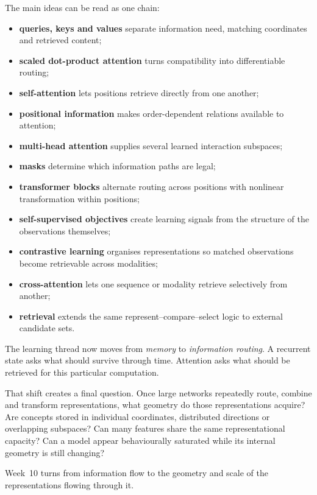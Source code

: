The main ideas can be read as one chain:
\begin{itemize}[leftmargin=*]
  \item \textbf{queries, keys and values} separate information need, matching coordinates and retrieved content;
  \item \textbf{scaled dot-product attention} turns compatibility into differentiable routing;
  \item \textbf{self-attention} lets positions retrieve directly from one another;
  \item \textbf{positional information} makes order-dependent relations available to attention;
  \item \textbf{multi-head attention} supplies several learned interaction subspaces;
  \item \textbf{masks} determine which information paths are legal;
  \item \textbf{transformer blocks} alternate routing across positions with nonlinear transformation within positions;
  \item \textbf{self-supervised objectives} create learning signals from the structure of the observations themselves;
  \item \textbf{contrastive learning} organises representations so matched observations become retrievable across modalities;
  \item \textbf{cross-attention} lets one sequence or modality retrieve selectively from another;
  \item \textbf{retrieval} extends the same represent--compare--select logic to external candidate sets.
\end{itemize}

The learning thread now moves from \emph{memory} to \emph{information routing}. A recurrent state asks what should survive through time. Attention asks what should be retrieved for this particular computation.

That shift creates a final question. Once large networks repeatedly route, combine and transform representations, what geometry do those representations acquire? Are concepts stored in individual coordinates, distributed directions or overlapping subspaces? Can many features share the same representational capacity? Can a model appear behaviourally saturated while its internal geometry is still changing?

Week~10 turns from information flow to the geometry and scale of the representations flowing through it.
